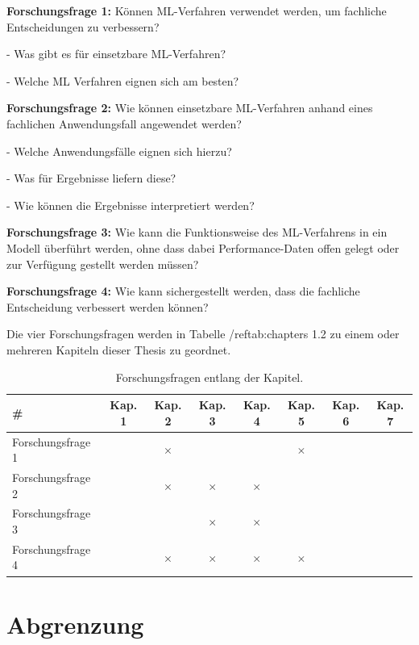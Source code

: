 \begin{itemize*}
\item \textbf{Forschungsfrage 1:} Können ML-Verfahren verwendet werden, um fachliche Entscheidungen zu verbessern? 

- Was gibt es für einsetzbare ML-Verfahren?

- Welche ML Verfahren eignen sich am besten?

\item \textbf{Forschungsfrage 2:} Wie können einsetzbare ML-Verfahren anhand eines fachlichen Anwendungsfall angewendet werden? 

- Welche Anwendungsfälle eignen sich hierzu?

- Was für Ergebnisse liefern diese? 

- Wie können die Ergebnisse interpretiert werden?

\item \textbf{Forschungsfrage 3:} Wie kann die Funktionsweise des ML-Verfahrens in ein Modell überführt werden, ohne dass dabei Performance-Daten offen gelegt oder zur Verfügung gestellt werden müssen?

\item \textbf{Forschungsfrage 4:} Wie kann sichergestellt werden, dass die fachliche Entscheidung verbessert werden können?
\end{itemize*}


Die vier Forschungsfragen werden in Tabelle /ref{tab:chapters} 1.2 zu einem oder mehreren Kapiteln dieser Thesis zu geordnet. 

\begin{table}[htb]
\centering
\small
\begin{tabular}{lccccccc}
\toprule
\# & Kap. 1 & Kap. 2 & Kap. 3 & Kap. 4 & Kap. 5 & Kap. 6 & Kap. 7\\
\toprule
Forschungsfrage 1 &  & $\times$ & & &$\times$& &\\\midrule
Forschungsfrage 2 &  &$\times$& $\times$ & $\times$ & & &\\\midrule
Forschungsfrage 3 &  & &  $\times$ & $\times$& & &\\\midrule
Forschungsfrage 4 &  &  $\times$& $\times$ &  $\times$&$\times$  & &\\\bottomrule
\end{tabular}
\caption{Forschungsfragen entlang der Kapitel.}
\label{tab:chapters}
\end{table}

\section{Abgrenzung}
\label{sec:Abgrenzung1}

